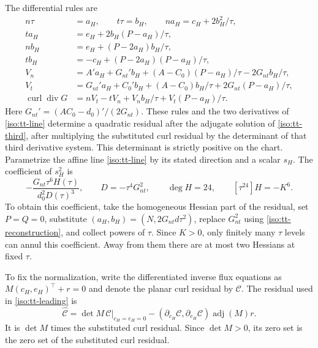 \documentclass[11pt,a4paper]{article}
\numberwithin{equation}{section}
\theoremstyle{plain}
\theoremstyle{definition}
\theoremstyle{remark}
\begin{document}
The differential rules are
\begin{align*}
 n\tau&=a_H,\qquad t\tau=b_H,\qquad n a_H=c_H+2b_H^2/\tau,\\
 t a_H&=e_H+2b_H(P-a_H)/\tau,\\
 n b_H&=e_H+(P-2a_H)b_H/\tau,\\
 t b_H&=-c_H+(P-2a_H)(P-a_H)/\tau,\\
 V_n&=A'a_H+G_{nt}'b_H+(A-C_0)(P-a_H)/\tau-2G_{nt} b_H/\tau,\\
 V_t&=G_{nt}'a_H+C_0'b_H+(A-C_0)b_H/\tau+2G_{nt}(P-a_H)/\tau,\\
 \operatorname{curl}\operatorname{div}G
 &=nV_t-tV_n+V_n b_H/\tau+V_t(P-a_H)/\tau.
\end{align*}
Here $G_{nt}'= (AC_0-d_0)'/(2G_{nt})$.  These rules and the two derivatives of
\eqref{iso:tt-line} determine a quadratic residual after the adjugate
solution of \eqref{iso:tt-third}, after multiplying the substituted
curl residual by the determinant of that third derivative system.
This determinant is strictly positive on the chart. Parametrize the affine line
\eqref{iso:tt-line} by its stated direction and a scalar $s_H$.  The
coefficient of $s_H^2$ is
\begin{equation}\label{iso:tt-leading}
 -\frac{G_{nt}\tau^6 H(\tau)}{d_0^2D(\tau)^3},\qquad
 D=-\tau^4G_{nt}^2,\qquad \deg H=24,\qquad [\tau^{24}]H=-K^6.
\end{equation}
To obtain this coefficient, take the homogeneous Hessian part of the residual, set $P=Q=0$, substitute $(a_H,b_H)=(N,2G_{nt}d\tau^2)$, replace $G_{nt}^2$ using \eqref{iso:tt-reconstruction}, and collect powers of $\tau$.  
Since $K>0$, only finitely many $\tau$ levels can annul this coefficient.
Away from them there are at most two Hessians at fixed $\tau$.

To fix the normalization, write the differentiated inverse flux
equations as $M(c_H,e_H)^{\top}+r=0$ and denote the planar curl residual by
$\mathcal C$. The residual used in \eqref{iso:tt-leading} is
\begin{equation}\label{appiso-tt-adjugate}
 \widehat{\mathcal C}
 =\det M\,\mathcal C|_{c_H=e_H=0}
   -(\partial_{c_H}\mathcal C,\partial_{e_H}\mathcal C)
                   \operatorname{adj}(M)r.
\end{equation}
It is $\det M$ times the substituted curl residual.  Since $\det M>0$, its zero set is the zero set of the substituted curl residual.
\end{document}
